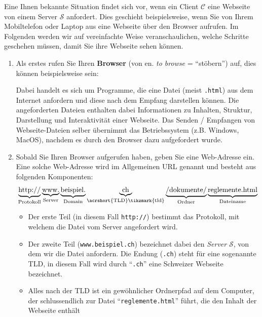 Eine Ihnen bekannte Situation findet sich vor, wenn ein Client $\mathcal{C}$ eine Webseite von einem Server $\mathcal{S}$ anfordert. Dies geschieht beispielsweise, wenn Sie von Ihrem Mobiltelefon oder Laptop aus eine Webseite über den Browser aufrufen. Im Folgenden werden wir auf vereinfachte Weise veranschaulichen, welche Schritte geschehen müssen, damit Sie ihre Webseite sehen können.


\begin{enumerate}
\item Als erstes rufen Sie Ihren \textbf{Browser} (von en. \textit{to browse} = ``stöbern'') auf, dies können beispielsweise sein: 
Dabei handelt es sich um Programme, die eine Datei (meist \texttt{.html}) aus dem Internet anfordern und diese nach dem Empfang darstellen können.  Die angeforderten Dateien enthalten dabei Informationen zu Inhalten, Struktur, Darstellung und Interaktivität einer Webseite. Das Senden / Empfangen von Webseite-Dateien selber übernimmt das Betriebssystem (z.B. Windows, MacOS), nachdem es durch den Browser dazu aufgefordert wurde.
\item Sobald Sie Ihren Browser aufgerufen haben, geben Sie eine Web-Adresse ein. Eine solche Web-Adresse wird im Allgemeinen \gls{URL} genannt und besteht aus folgenden Komponenten:
\[
\underbrace{\text{http://}}_{\text{Protokoll}}
\underbrace{\text{www.}}_{\text{Server}}
\underbrace{\text{beispiel.}}_{\text{Domain}}
\underbrace{\text{ch}}_{\text{\acrshort{TLD}\tikzmark{tld}}}
\underbrace{\text{/dokumente/}}_{\text{Ordner}}
\underbrace{\text{reglemente.html}}_{\text{Dateiname}}
\]

\begin{itemize}
\item Der erste Teil (in diesem Fall \texttt{http://}) bestimmt das Protokoll, mit welchem die Datei vom Server angefordert wird.
\item Der zweite Teil (\texttt{www.beispiel.ch}) bezeichnet dabei den \textit{Server} $\mathcal{S}$, von dem wir die Datei anfordern. Die Endung (\texttt{.ch}) steht für eine sogenannte \gls{TLD}, in diesem Fall wird durch ``\texttt{.ch}'' eine Schweizer Webseite bezeichnet.
\item Alles nach der \gls{TLD} ist ein gewöhnlicher Ordnerpfad auf dem Computer, der schlussendlich zur Datei ``\texttt{reglemente.html}'' führt, die den Inhalt der Webseite enthält
\end{itemize}


\end{enumerate}
